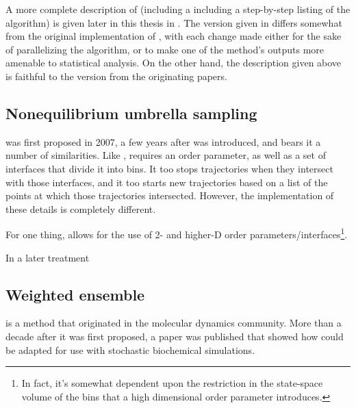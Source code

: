 
A more complete description of  (including a including a step-by-step listing of the algorithm) is given later in this thesis in . The version given in  differs somewhat from the original implementation of , with each change made either for the sake of parallelizing the algorithm, or to make one of the method's outputs more amenable to statistical analysis. On the other hand, the description given above is faithful to the version from the originating papers\supercite{Allen:2005wy,Allen:2006cp,Allen:2009kb}.

\subsection{Nonequilibrium umbrella sampling}
 was first proposed\supercite{Warmflash:2007dz} in 2007, a few years after  was introduced, and bears it a number of similarities. Like ,  requires an order parameter, as well as a set of interfaces that divide it into bins. It too stops trajectories when they intersect with those interfaces, and it too starts new trajectories based on a list of the points at which those trajectories intersected. However, the implementation of these details is completely different. 

For one thing,  allows for the use of 2- and higher-D order parameters/interfaces\footnote{In fact, it's somewhat dependent upon the restriction in the state-space volume of the bins that a high dimensional order parameter introduces.}. 

\supercite{Dickson:2009gt,Dickson:2009fua}

In a later treatment\supercite{Dickson:2010gf}



\subsection{Weighted ensemble}
 is a method that originated\supercite{Huber:1996dn} in the molecular dynamics community. More than a decade after it was first proposed, a paper\supercite{Bhatt:2010df} was published that showed how  could be adapted for use with stochastic biochemical simulations.
\supercite{Donovan:2013gz,Donovan:2016bi,Zuckerman:2017eq}

